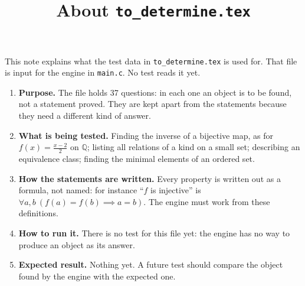 \documentclass[11pt,a4paper]{article}
\title{About \texttt{to\_determine.tex}}
\author{}
\date{}
\begin{document}
\maketitle
This note explains what the test data in \texttt{to\_determine.tex} is used for. That file is input for the engine in \texttt{main.c}. No test reads it yet.

\begin{enumerate}
\item \textbf{Purpose.} The file holds 37 questions: in each one an object is to be found, not a statement proved. They are kept apart from the statements because they need a different kind of answer.

\item \textbf{What is being tested.} Finding the inverse of a bijective map, as for $f(x) = \frac{x - 2}{2}$ on $\mathbb{Q}$; listing all relations of a kind on a small set; describing an equivalence class; finding the minimal elements of an ordered set.

\item \textbf{How the statements are written.} Every property is written out as a formula, not named: for instance ``$f$ is injective'' is $\forall a, b\ (f(a) = f(b) \implies a = b)$. The engine must work from these definitions.

\item \textbf{How to run it.} There is no test for this file yet: the engine has no way to produce an object as its answer.

\item \textbf{Expected result.} Nothing yet. A future test should compare the object found by the engine with the expected one.
\end{enumerate}
\end{document}
